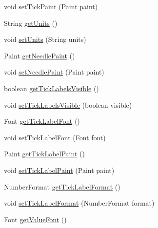 \begin{DoxyCompactItemize}
void \mbox{\hyperlink{classorg_1_1jfree_1_1chart_1_1plot_1_1_meter_plot_a97ca193d5f4d6c1e4e291798b5b5ba74}{set\+Tick\+Paint}} (Paint paint)
\item 
String \mbox{\hyperlink{classorg_1_1jfree_1_1chart_1_1plot_1_1_meter_plot_a905469866f0465792ee58a17a9eb221a}{get\+Units}} ()
\item 
void \mbox{\hyperlink{classorg_1_1jfree_1_1chart_1_1plot_1_1_meter_plot_acb00315501970dbaaab783969c621103}{set\+Units}} (String units)
\item 
Paint \mbox{\hyperlink{classorg_1_1jfree_1_1chart_1_1plot_1_1_meter_plot_af41ded0aa388151876aa97f63a39439b}{get\+Needle\+Paint}} ()
\item 
void \mbox{\hyperlink{classorg_1_1jfree_1_1chart_1_1plot_1_1_meter_plot_a3fe63e901f282c3ea499d816c612e9a9}{set\+Needle\+Paint}} (Paint paint)
\item 
boolean \mbox{\hyperlink{classorg_1_1jfree_1_1chart_1_1plot_1_1_meter_plot_a79cddb55aadd6e29195297e9246f495d}{get\+Tick\+Labels\+Visible}} ()
\item 
void \mbox{\hyperlink{classorg_1_1jfree_1_1chart_1_1plot_1_1_meter_plot_ae3aee668c150efd7e0f7b0f748e4472e}{set\+Tick\+Labels\+Visible}} (boolean visible)
\item 
Font \mbox{\hyperlink{classorg_1_1jfree_1_1chart_1_1plot_1_1_meter_plot_aec1151f0cb9d83a473e0b47cfebffeb4}{get\+Tick\+Label\+Font}} ()
\item 
void \mbox{\hyperlink{classorg_1_1jfree_1_1chart_1_1plot_1_1_meter_plot_ad56c6b3df6614f5cada840323c89120b}{set\+Tick\+Label\+Font}} (Font font)
\item 
Paint \mbox{\hyperlink{classorg_1_1jfree_1_1chart_1_1plot_1_1_meter_plot_a3f1876a141990a24ca5d98e47dc9a245}{get\+Tick\+Label\+Paint}} ()
\item 
void \mbox{\hyperlink{classorg_1_1jfree_1_1chart_1_1plot_1_1_meter_plot_af626b2132fcbeed2c4c900da682deb74}{set\+Tick\+Label\+Paint}} (Paint paint)
\item 
Number\+Format \mbox{\hyperlink{classorg_1_1jfree_1_1chart_1_1plot_1_1_meter_plot_af7eb3b4f3cb33da29b6d951761e83eb1}{get\+Tick\+Label\+Format}} ()
\item 
void \mbox{\hyperlink{classorg_1_1jfree_1_1chart_1_1plot_1_1_meter_plot_aafbb4bf29df5fb0818b1f8e4e4fc02e2}{set\+Tick\+Label\+Format}} (Number\+Format format)
\item 
Font \mbox{\hyperlink{classorg_1_1jfree_1_1chart_1_1plot_1_1_meter_plot_a12d73d067c872a15f1514c43b642c774}{get\+Value\+Font}} ()
\item 

\end{DoxyCompactItemize}
